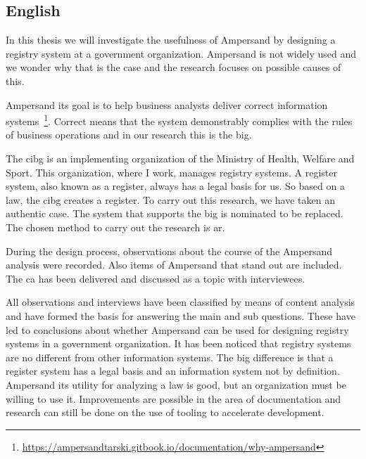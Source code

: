 \newpage
\subsection*{English}
In this thesis we will investigate the usefulness of Ampersand by designing a registry system at a government organization.
Ampersand is not widely used and we wonder why that is the case and the research focuses on possible causes of this.

Ampersand its goal is to help business analysts deliver correct information systems~\footnote{\url{https://ampersandtarski.gitbook.io/documentation/why-ampersand}}. 
Correct means that the system demonstrably complies with the rules of business operations and in our research this is the \acrshort{big}.

The \acrshort{cibg} is an implementing organization of the Ministry of Health, Welfare and Sport.
This organization, where I work, manages registry systems.
A register system, also known as a register, always has a legal basis for us.
So based on a law, the \acrshort{cibg} creates a register.
To carry out this research, we have taken an authentic case.
The system that supports the \acrshort{big} is nominated to be replaced.
The chosen method to carry out the research is \acrshort{ar}.

During the design process, observations about the course of the Ampersand analysis were recorded.
Also items of Ampersand that stand out are included.
The \acrlong{ca} has been delivered and discussed as a topic with interviewees.

All observations and interviews have been classified by means of content analysis and have formed the basis for answering the main and sub questions.
These have led to conclusions about whether Ampersand can be used for designing registry systems in a government organization.
It has been noticed that registry systems are no different from other information systems.
The big difference is that a register system has a legal basis and an information system not by definition.
Ampersand its utility for analyzing a law is good, but an organization must be willing to use it.
Improvements are possible in the area of documentation and research can still be done on the use of tooling to accelerate development.